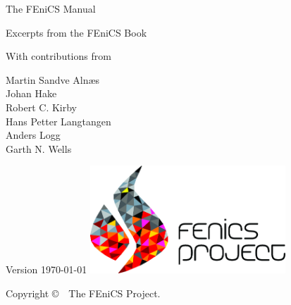 \thispagestyle{empty}

\noindent
{\Huge The FEniCS Manual}

\vspace{6ex}

\noindent
{\Large
Excerpts from the FEniCS Book}

\vspace{6ex}

\noindent
{\large With contributions from}

\vspace{2ex}

\noindent
\bigskip
{\Large Martin Sandve Aln\ae{}s} \\
\bigskip
{\Large Johan Hake} \\
\bigskip
{\Large Robert C. Kirby} \\
\bigskip
{\Large Hans Petter Langtangen} \\
\bigskip
{\Large Anders Logg} \\
\bigskip
{\Large Garth N. Wells}

\vfill

\noindent
{\large Version \today}
\hfill
\includegraphics[width=0.55\textwidth]{png/fenics_logo_text.png}

\newpage
\thispagestyle{empty}

\null
\vfill

\noindent

\vspace{2ex}

\noindent
{\footnotesize Copyright \copyright\ \the\year\ The FEniCS Project.}

\vspace{2ex}


